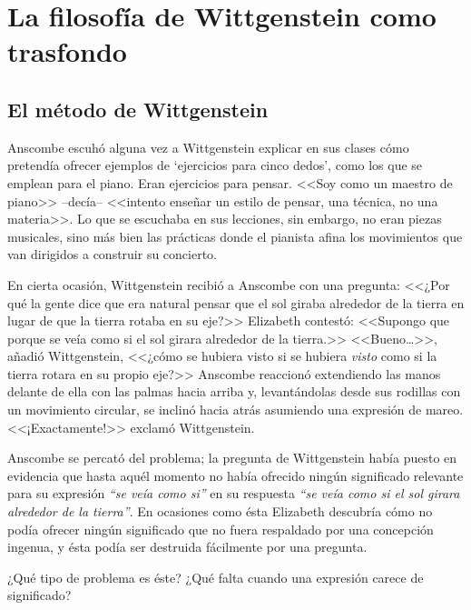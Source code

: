 \section{La filosofía de Wittgenstein como trasfondo}

\subsection{El método de Wittgenstein}

Anscombe escuhó alguna vez a Wittgenstein explicar en sus clases cómo pretendía
ofrecer ejemplos de `ejercicios para cinco dedos', como los que se emplean para
el piano. Eran ejercicios para pensar. <<Soy como un maestro de piano>>
--decía-- <<intento enseñar un estilo de pensar, una técnica, no una materia>>.
Lo que se escuchaba en sus lecciones, sin embargo, no eran piezas musicales,
sino más bien las prácticas donde el pianista afina los movimientos que van
dirigidos a construir su concierto.\autocite[cf.~][p.~357]{pubnpriv}

En cierta ocasión, Wittgenstein recibió a Anscombe con una pregunta: <<¿Por qué
la gente dice que era natural pensar que el sol giraba alrededor de la tierra en
lugar de que la tierra rotaba en su eje?>> Elizabeth contestó: <<Supongo que
porque se veía como si el sol girara alrededor de la tierra.>> <<Bueno\ldots>>,
añadió Wittgenstein, <<¿cómo se hubiera visto si se hubiera \emph{visto} como si
la tierra rotara en su propio eje?>> Anscombe reaccionó extendiendo las manos
delante de ella con las palmas hacia arriba y, levantándolas desde sus rodillas
con un movimiento circular, se inclinó hacia atrás asumiendo una expresión de
mareo. <<¡Exactamente!>> exclamó Wittgenstein.\autocite[cf.~][p.~151]{IWT}

Anscombe se percató del problema; la pregunta de Wittgenstein había puesto en
evidencia que hasta aquél momento no había ofrecido ningún significado relevante
para su expresión \emph{``se veía como si''} en su respuesta \emph{``se veía
  como si el sol girara alrededor de la tierra''}. En ocasiones como ésta
Elizabeth descubría cómo no podía ofrecer ningún significado que no fuera
respaldado por una concepción ingenua, y ésta podía ser destruida fácilmente por
una pregunta. 

¿Qué tipo de problema es éste? ¿Qué falta cuando una expresión carece de
significado?

